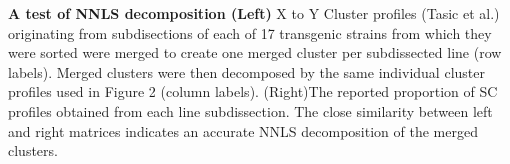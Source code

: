 \textbf{A test of NNLS decomposition (Left)} X to Y Cluster profiles (Tasic et al.) originating from subdisections of each of 17 transgenic strains from which they were sorted were merged to create one merged cluster per subdissected line (row labels). Merged clusters were then decomposed by the same individual cluster profiles used in Figure 2 (column labels). (Right)The reported proportion of SC profiles obtained from each line subdissection. The close similarity between left and right matrices indicates an accurate NNLS decomposition of the merged clusters.